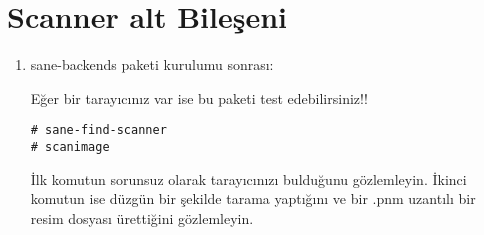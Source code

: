 \documentclass[a4paper,10pt]{article}
\begin{document}
\section{Scanner alt Bileşeni}
\begin{enumerate}
\item sane-backends paketi kurulumu sonrası:

Eğer bir tarayıcınız var ise bu paketi test edebilirsiniz!!
\begin{verbatim}
# sane-find-scanner
# scanimage 
\end{verbatim}

İlk komutun sorunsuz olarak tarayıcınızı bulduğunu gözlemleyin.
İkinci komutun ise düzgün bir şekilde tarama yaptığını ve bir .pnm uzantılı bir resim dosyası ürettiğini gözlemleyin.

\end{enumerate}
\end{document}
